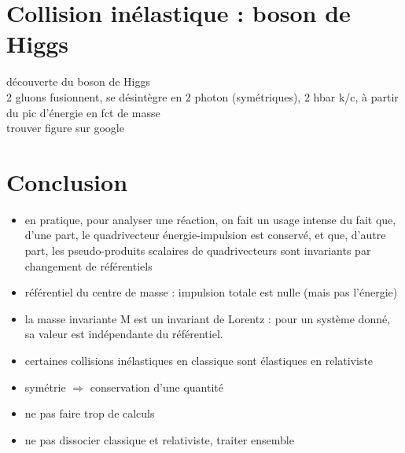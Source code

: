 \section{Collision inélastique : boson de Higgs}
découverte du boson de Higgs \\
2 gluons fusionnent, se désintègre en 2 photon (symétriques), 2 hbar k/c, à partir du pic d'énergie en fct de masse \\
trouver figure sur google

\section*{Conclusion}



\begin{remarques} \begin{itemize} 
\item en pratique, pour analyser une réaction, on fait un usage intense du fait que, d’une part, le quadrivecteur énergie-impulsion est conservé, et que, d’autre part, les pseudo-produits scalaires de quadrivecteurs sont invariants par changement de référentiels
\item référentiel du centre de masse : impulsion totale est nulle (mais pas l'énergie)
\item la masse invariante M est un invariant de Lorentz : pour un système donné, sa valeur est indépendante du référentiel.
\item certaines collisions inélastiques en classique sont élastiques en relativiste
\item symétrie $\Rightarrow$ conservation d'une quantité
\item ne pas faire trop de calculs
\item ne pas dissocier classique et relativiste, traiter ensemble
\end{itemize} \end{remarques}